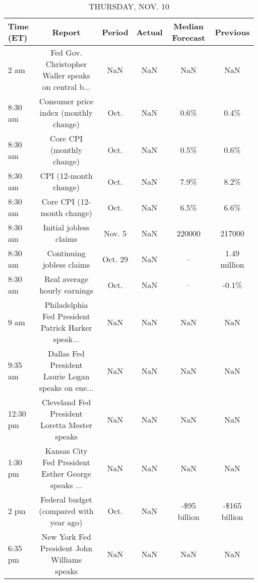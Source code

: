 \documentclass{article}%
\begin{document}
%


\begin{table}[htbp]%
\caption{THURSDAY, NOV. 10}%
\centering%
\begin{adjustbox}{width=1\textwidth}%
\begin{tabular}{lccccc}
\toprule
Time (ET) &                                             Report &  Period & Actual & Median Forecast &      Previous \\
\midrule
     2 am & Fed Gov. Christopher Waller speaks on central b... &     NaN &    NaN &             NaN &           NaN \\
  8:30 am &              Consumer price index (monthly change) &    Oct. &    NaN &            0.6\% &          0.4\% \\
  8:30 am &                          Core CPI (monthly change) &    Oct. &    NaN &            0.5\% &          0.6\% \\
  8:30 am &                              CPI (12-month change) &    Oct. &    NaN &            7.9\% &          8.2\% \\
  8:30 am &                         Core CPI (12-month change) &    Oct. &    NaN &            6.5\% &          6.6\% \\
  8:30 am &                             Initial jobless claims &  Nov. 5 &    NaN &          220000 &        217000 \\
  8:30 am &                          Continuing jobless claims & Oct. 29 &    NaN &              -- &  1.49 million \\
  8:30 am &                       Real average hourly earnings &    Oct. &    NaN &              -- &         -0.1\% \\
     9 am & Philadelphia Fed President Patrick Harker speak... &     NaN &    NaN &             NaN &           NaN \\
  9:35 am & Dallas Fed President Laurie Logan speaks on ene... &     NaN &    NaN &             NaN &           NaN \\
 12:30 pm &      Cleveland Fed President Loretta Mester speaks &     NaN &    NaN &             NaN &           NaN \\
  1:30 pm & Kansas City Fed President Esther George speaks ... &     NaN &    NaN &             NaN &           NaN \\
     2 pm &            Federal budget (compared with year ago) &    Oct. &    NaN &    -\$95 billion & -\$165 billion \\
  6:35 pm &        New York Fed President John Williams speaks &     NaN &    NaN &             NaN &           NaN \\
\bottomrule
\end{tabular}
%
\end{adjustbox}%
\end{table}
\end{document}

